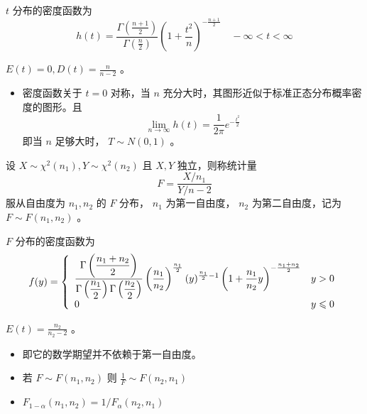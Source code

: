  $ t $ 分布的密度函数为
\begin{equation}
    h(t) = \frac{\Gamma\left(\frac{n+1}{2}\right)}{\Gamma\left(\frac{n}{2}\right)} \left(1 + \frac{t^2}{n}\right)^{-\frac{n+1}{2}}
    \quad -\infty < t < \infty
\end{equation}

 $ E(t) = 0, D(t) = \frac{n}{n-2} $ 。

\begin{itemize}[leftmargin=\subparitemindent]
    \item 密度函数关于 $ t=0 $ 对称，当 $ n $ 充分大时，其图形近似于标准正态分布概率密度的图形。且
    \begin{equation}
        \lim_{n \rightarrow \infty} h(t) = \frac{1}{2\pi} e^{-\frac{t^2}{2}}
    \end{equation}
    即当 $ n $ 足够大时， $ T \sim N(0,1) $ 。
\end{itemize}

 设 $ X \sim \chi^2(n_1), Y \sim \chi^2(n_2) $ 且 $ X,Y $ 独立，则称统计量
\begin{equation}
    F = \frac{X/n_1}{Y/n-2}
\end{equation}
服从自由度为 $ n_1,n_2 $ 的 $ F $ 分布， $ n_1 $ 为第一自由度， $ n_2 $ 为第二自由度，记为 $ F \sim F(n_1,n_2) $ 。

 $ F $ 分布的密度函数为
\begin{equation}
    f(y) = \left\{ \begin{array}{ll}
        \displaystyle{\frac{\displaystyle{\Gamma\left(\displaystyle{\frac{\displaystyle{n_1+n_2}}{\displaystyle{2}}}\right)}}{\displaystyle{\Gamma\left(\displaystyle{\frac{\displaystyle{n_1}}{\displaystyle{2}}}\right)\Gamma\left(\displaystyle{\frac{\displaystyle{n_2}}{\displaystyle{2}}}\right)}}}
        \left(\frac{n_1}{n_2}\right) ^{\frac{n_1}{2}}(y)^{\frac{n_1}{2} - 1}
        \left( 1 + \frac{n_1}{n_2}y \right)^{-\frac{n_1+n_2}{2}} & y > 0 \\
        0 & y \leqslant 0
    \end{array} \right.
\end{equation}

 $ E(t) = \frac{n_2}{n_2 - 2} $ 。

\begin{itemize}[leftmargin=\subparitemindent]
    \item 即它的数学期望并不依赖于第一自由度。
    \item 若 $ F \sim F(n_1, n_2) $ 则 $ \frac{1}{F} \sim F(n_2, n_1) $
    \item $ F_{1 - \alpha}(n_1,n_2) = 1 / F_{\alpha}(n_2,n_1) $
\end{itemize}

